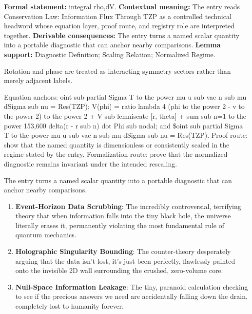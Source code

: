 \begingroup\footnotesize\setlength{\emergencystretch}{3em}\sloppy
\textbf{Formal statement:} integral rho,dV. \textbf{Contextual meaning:} The entry reads Conservation Law: Information Flux Through TZP as a controlled technical headword whose equation layer, proof route, and registry role are interpreted together. \textbf{Derivable consequences:} The entry turns a named scalar quantity into a portable diagnostic that can anchor nearby comparisons. \textbf{Lemma support:} Diagnostic Definition; Scaling Relation; Normalized Regime.\par
\endgroup

Rotation and phase are treated as interacting symmetry sectors rather than merely adjacent labels.

Equation anchors: oint sub partial Sigma T to the power mu u sub vac n sub mu dSigma sub nu = Res(TZP); V(phi) = ratio lambda 4 (phi to the power 2 - v to the power 2) to the power 2 + V sub lemniscate [r, theta] + sum sub n=1 to the power 153,600 delta(r - r sub n) dot Phi sub nodal; and \$oint sub partial Sigma T to the power mu u sub vac n sub mu dSigma sub nu = Res(TZP). Proof route: show that the named quantity is dimensionless or consistently scaled in the regime stated by the entry. Formalization route: prove that the normalized diagnostic remains invariant under the intended rescaling.

The entry turns a named scalar quantity into a portable diagnostic that can anchor nearby comparisons.
\endgroup

\begin{enumerate}[leftmargin=1.6em,itemsep=6pt,topsep=4pt]
\item \textbf{Event-Horizon Data Scrubbing}: The incredibly controversial, terrifying theory that when information falls into the tiny black hole, the universe literally erases it, permanently violating the most fundamental rule of quantum mechanics.
\item \textbf{Holographic Singularity Bounding}: The counter-theory desperately arguing that the data isn't lost, it's just been perfectly, flawlessly painted onto the invisible 2D wall surrounding the crushed, zero-volume core.
\item \textbf{Null-Space Information Leakage}: The tiny, paranoid calculation checking to see if the precious answers we need are accidentally falling down the drain, completely lost to humanity forever.
\end{enumerate}

